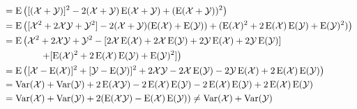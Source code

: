 \begin{enumerate}
\begin{myproof}
\begin{align*}
                      &= \operatorname{E} \left([(\mathcal X + \mathcal Y)]^2 - 2(\mathcal X + \mathcal Y)\operatorname{E}(\mathcal X + \mathcal Y) + (\operatorname{E}(\mathcal X + \mathcal Y))^2\right) \\
                      &= \operatorname{E} \left([\mathcal X^2 + 2\mathcal X \mathcal Y + \mathcal Y^2] - 2(\mathcal X + \mathcal Y)(\operatorname{E}(\mathcal X) + \operatorname{E}(\mathcal Y)) + (\operatorname{E}(\mathcal X)^2 + 2\operatorname{E}(\mathcal X)\operatorname{E}(\mathcal Y) + \operatorname{E}(\mathcal Y)^2)\right) \\
                      &= \operatorname{E} \left(\mathcal X^2 + 2\mathcal X \mathcal Y + \mathcal Y^2 - [2\mathcal X\operatorname{E}(\mathcal X) + 2\mathcal X\operatorname{E}(\mathcal Y) + 2\mathcal Y\operatorname{E}(\mathcal X) + 2\mathcal Y\operatorname{E}(\mathcal Y)] \right. \\
                      &\qquad\qquad \left. + [\operatorname{E}(\mathcal X)^2 + 2\operatorname{E}(\mathcal X)\operatorname{E}(\mathcal Y) + \operatorname{E}(\mathcal Y)^2]\right) \\
                      &= \operatorname{E} \left([\mathcal X - \operatorname{E}(\mathcal X)]^2 + [\mathcal Y - \operatorname{E}(\mathcal Y)]^2 + 2\mathcal X \mathcal Y - 2\mathcal X\operatorname{E}(\mathcal Y) - 2\mathcal Y\operatorname{E}(\mathcal X) + 2\operatorname{E}(\mathcal X)\operatorname{E}(\mathcal Y)\right) \\
                      &= \operatorname{Var}(\mathcal X) + \operatorname{Var}(\mathcal Y) + 2\operatorname{E}(\mathcal X \mathcal Y) - 2\operatorname{E}(\mathcal X)\operatorname{E}(\mathcal Y) - 2\operatorname{E}(\mathcal X)\operatorname{E}(\mathcal Y) + 2\operatorname{E}(\mathcal X)\operatorname{E}(\mathcal Y) \\
                      &= \operatorname{Var}(\mathcal X) + \operatorname{Var}(\mathcal Y) + 2(\operatorname{E}(\mathcal X \mathcal Y) - \operatorname{E}(\mathcal X)\operatorname{E}(\mathcal Y)) \neq \operatorname{Var}(\mathcal X) + \operatorname{Var}(\mathcal Y)
    \end{align*}
  \end{myproof}
\end{enumerate}


